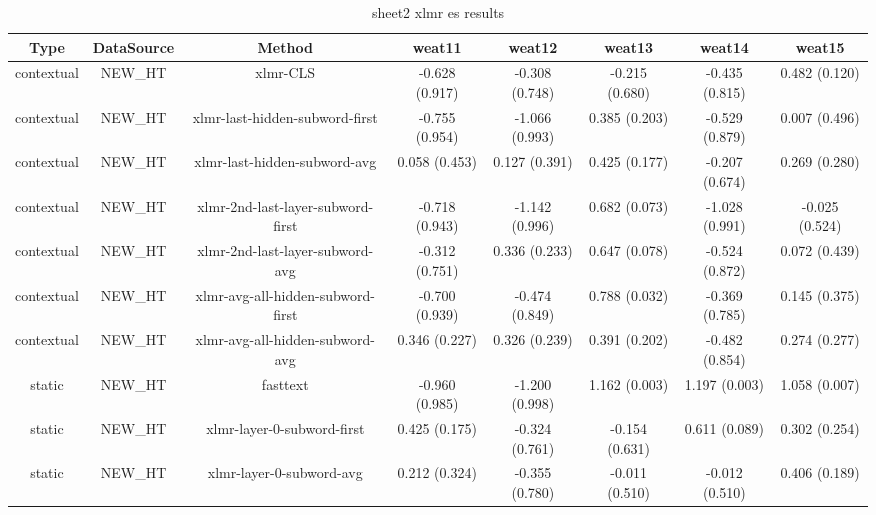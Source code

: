 \begin{sidewaystable}[htb]
    \centering
    \caption{sheet2 xlmr es results}
    \label{appendix_tab:sheet2_xlmr_es_results}
    \small
    \begin{tabular}{@{}cccccccc@{}}
        \toprule
        Type & DataSource & Method & weat11 & weat12 & weat13 & weat14 & weat15 \\
        \midrule
        contextual & NEW\_HT & xlmr-CLS & -0.628 (0.917) & -0.308 (0.748) & -0.215 (0.680) & -0.435 (0.815) & 0.482 (0.120) \\
        contextual & NEW\_HT & xlmr-last-hidden-subword-first & -0.755 (0.954) & -1.066 (0.993) & 0.385 (0.203) & -0.529 (0.879) & 0.007 (0.496) \\
        contextual & NEW\_HT & xlmr-last-hidden-subword-avg & 0.058 (0.453) & 0.127 (0.391) & 0.425 (0.177) & -0.207 (0.674) & 0.269 (0.280) \\
        contextual & NEW\_HT & xlmr-2nd-last-layer-subword-first & -0.718 (0.943) & -1.142 (0.996) & 0.682 (0.073) & -1.028 (0.991) & -0.025 (0.524) \\
        contextual & NEW\_HT & xlmr-2nd-last-layer-subword-avg & -0.312 (0.751) & 0.336 (0.233) & 0.647 (0.078) & -0.524 (0.872) & 0.072 (0.439) \\
        contextual & NEW\_HT & xlmr-avg-all-hidden-subword-first & -0.700 (0.939) & -0.474 (0.849) & 0.788 (0.032) & -0.369 (0.785) & 0.145 (0.375) \\
        contextual & NEW\_HT & xlmr-avg-all-hidden-subword-avg & 0.346 (0.227) & 0.326 (0.239) & 0.391 (0.202) & -0.482 (0.854) & 0.274 (0.277) \\
        static & NEW\_HT & fasttext & -0.960 (0.985) & -1.200 (0.998) & 1.162 (0.003) & 1.197 (0.003) & 1.058 (0.007) \\
        static & NEW\_HT & xlmr-layer-0-subword-first & 0.425 (0.175) & -0.324 (0.761) & -0.154 (0.631) & 0.611 (0.089) & 0.302 (0.254) \\
        static & NEW\_HT & xlmr-layer-0-subword-avg & 0.212 (0.324) & -0.355 (0.780) & -0.011 (0.510) & -0.012 (0.510) & 0.406 (0.189) \\
        \bottomrule
    \end{tabular}
\end{sidewaystable}